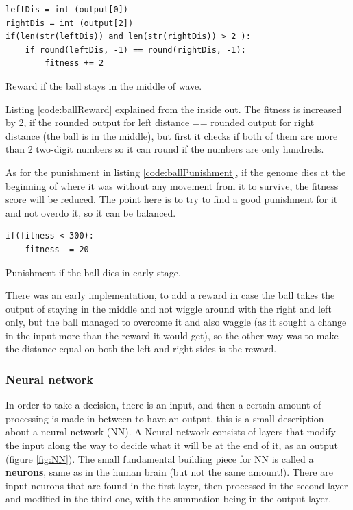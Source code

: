 \begin{listing}[H]
\begin{verbatim}
leftDis = int (output[0])
rightDis = int (output[2])
if(len(str(leftDis)) and len(str(rightDis)) > 2 ):
	if round(leftDis, -1) == round(rightDis, -1):
		fitness += 2
\end{verbatim}
\caption{Reward if the ball stays in the middle of wave.}
\label{code:ballReward}
\end{listing}

Listing \ref{code:ballReward} explained from the inside out. The fitness is increased by 2, if the rounded output for left distance == rounded output for right distance (the ball is in the middle), but first it checks if both of them are more than 2 two-digit numbers so it can round if the numbers are only hundreds.

As for the punishment in listing \ref{code:ballPunishment}, if the genome dies at the beginning of where it was without any movement from it to survive, the fitness score will be reduced. The point here is to try to find a good punishment for it and not overdo it, so it can be balanced.

\begin{listing}[H]
	\begin{verbatim}
if(fitness < 300):
	fitness -= 20
	\end{verbatim}
\caption{Punishment if the ball dies in early stage.}
\label{code:ballPunishment}
\end{listing}

There was an early implementation, to add a reward in case the ball takes the output of staying in the middle and not wiggle around with the right and left only, but the ball managed to overcome it and also waggle (as it sought a change in the input more than the reward it would get), so the other way was to make the distance equal on both the left and right sides is the reward.

\subsubsection{Neural network}
In order to take a decision, there is an input, and then a certain amount of processing is made in between to have an output, this is a small description about a neural network (NN). A Neural network consists of layers that modify the input along the way to decide what it will be at the end of it, as an output (figure \ref{fig:NN}). The small fundamental building piece for NN is called a \textbf{neurons}, same as in the human brain (but not the same amount!). There are input neurons that are found in the first layer, then processed in the second layer and modified in the third one, with the summation being in the output layer.

